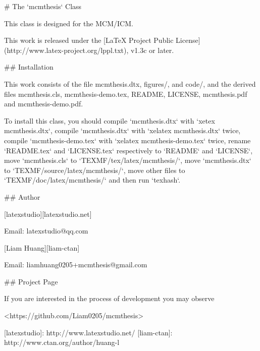 # The `mcmthesis` Class

This class is designed for the MCM/ICM.

This work is released under the [LaTeX Project Public
License](http://www.latex-project.org/lppl.txt), v1.3c or later.

## Installation

This work consists of the file mcmthesis.dtx,
                               figures/, and
                               code/,
and the derived files          mcmthesis.cls,
                               mcmthesis-demo.tex,
                               README,
                               LICENSE,
                               mcmthesis.pdf and
                               mcmthesis-demo.pdf.

To install this class, you should
    compile `mcmthesis.dtx` with `xetex mcmthesis.dtx`,
    compile `mcmthesis.dtx` with `xelatex mcmthesis.dtx` twice,
    compile `mcmthesis-demo.tex` with `xelatex mcmthesis-demo.tex` twice,
    rename `README.tex` and `LICENSE.tex` respectively to
      `README` and `LICENSE`,
    move `mcmthesis.cls` to `TEXMF/tex/latex/mcmthesis/`,
    move `mcmthesis.dtx` to `TEXMF/source/latex/mcmthesis/`,
    move other files     to `TEXMF/doc/latex/mcmthesis/` and then
    run `texhash`.

## Author

[latexstudio][latexstudio.net]

Email: latexstudio@qq.com

[Liam Huang][liam-ctan]

Email: liamhuang0205+mcmthesis@gmail.com

## Project Page

If you are interested in the process of development you may observe

<https://github.com/Liam0205/mcmthesis>

[latexstudio]: http://www.latexstudio.net/
[liam-ctan]: http://www.ctan.org/author/huang-l
